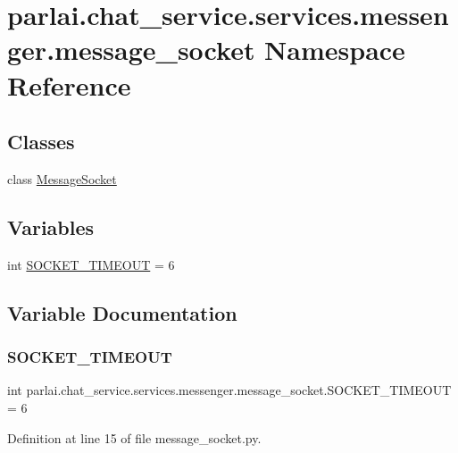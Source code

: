 \hypertarget{namespaceparlai_1_1chat__service_1_1services_1_1messenger_1_1message__socket}{}\section{parlai.\+chat\+\_\+service.\+services.\+messenger.\+message\+\_\+socket Namespace Reference}
\label{namespaceparlai_1_1chat__service_1_1services_1_1messenger_1_1message__socket}
\subsection*{Classes}
\begin{DoxyCompactItemize}
\item 
class \hyperlink{classparlai_1_1chat__service_1_1services_1_1messenger_1_1message__socket_1_1MessageSocket}{Message\+Socket}
\end{DoxyCompactItemize}
\subsection*{Variables}
\begin{DoxyCompactItemize}
\item 
int \hyperlink{namespaceparlai_1_1chat__service_1_1services_1_1messenger_1_1message__socket_a92bb5774ff4a58fb856c8fd1e6bc2dc4}{S\+O\+C\+K\+E\+T\+\_\+\+T\+I\+M\+E\+O\+UT} = 6
\end{DoxyCompactItemize}


\subsection{Variable Documentation}
\mbox{\label{namespaceparlai_1_1chat__service_1_1services_1_1messenger_1_1message__socket_a92bb5774ff4a58fb856c8fd1e6bc2dc4}} 
\subsubsection{\texorpdfstring{S\+O\+C\+K\+E\+T\+\_\+\+T\+I\+M\+E\+O\+UT}{SOCKET\_TIMEOUT}}
{\footnotesize\ttfamily int parlai.\+chat\+\_\+service.\+services.\+messenger.\+message\+\_\+socket.\+S\+O\+C\+K\+E\+T\+\_\+\+T\+I\+M\+E\+O\+UT = 6}



Definition at line 15 of file message\+\_\+socket.\+py.

